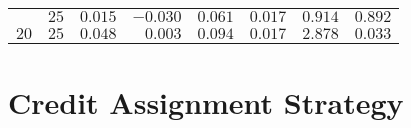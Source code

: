 \begin{table}[htbp]
{\begin{tabular}{lrrrrrrr}
			$ $                  & $25$                 & $0.015$              & $-0.030$                                        & $0.061$              & $0.017$              & $0.914$              & $0.892$     \\
			$20$                 & $25$                 & $0.048$              & $0.003$                                         & $0.094$              & $0.017$              & $2.878$              & $0.033$     \\
			\bottomrule
		\end{tabular}
	}
\end{table}

\section{Credit Assignment Strategy}\label{app:statistical_analysis:bhh_variant_credit}

\begin{table}[htbp]
	\centering
	\caption{ANOVA - Rank - BHH Variant: Credit}
	\label{tab:results:credit:anova}%
	\par\bigskip
\end{table}


